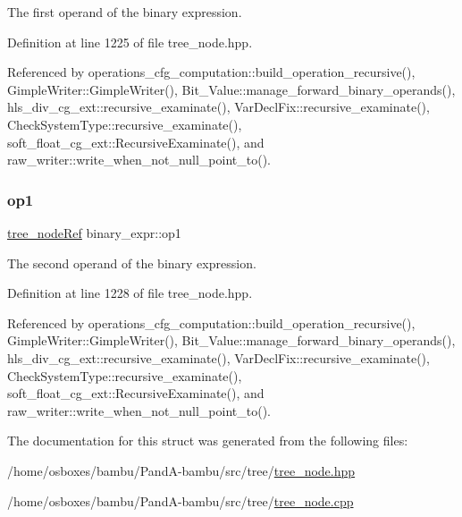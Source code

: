 The first operand of the binary expression. 



Definition at line 1225 of file tree\+\_\+node.\+hpp.



Referenced by operations\+\_\+cfg\+\_\+computation\+::build\+\_\+operation\+\_\+recursive(), Gimple\+Writer\+::\+Gimple\+Writer(), Bit\+\_\+\+Value\+::manage\+\_\+forward\+\_\+binary\+\_\+operands(), hls\+\_\+div\+\_\+cg\+\_\+ext\+::recursive\+\_\+examinate(), Var\+Decl\+Fix\+::recursive\+\_\+examinate(), Check\+System\+Type\+::recursive\+\_\+examinate(), soft\+\_\+float\+\_\+cg\+\_\+ext\+::\+Recursive\+Examinate(), and raw\+\_\+writer\+::write\+\_\+when\+\_\+not\+\_\+null\+\_\+point\+\_\+to().

\mbox{\label{structbinary__expr_ad80e58bd41c1f8e5d7c6fc632d27601e}} 
\subsubsection{\texorpdfstring{op1}{op1}}
{\footnotesize\ttfamily \hyperlink{tree__node_8hpp_a6ee377554d1c4871ad66a337eaa67fd5}{tree\+\_\+node\+Ref} binary\+\_\+expr\+::op1}



The second operand of the binary expression. 



Definition at line 1228 of file tree\+\_\+node.\+hpp.



Referenced by operations\+\_\+cfg\+\_\+computation\+::build\+\_\+operation\+\_\+recursive(), Gimple\+Writer\+::\+Gimple\+Writer(), Bit\+\_\+\+Value\+::manage\+\_\+forward\+\_\+binary\+\_\+operands(), hls\+\_\+div\+\_\+cg\+\_\+ext\+::recursive\+\_\+examinate(), Var\+Decl\+Fix\+::recursive\+\_\+examinate(), Check\+System\+Type\+::recursive\+\_\+examinate(), soft\+\_\+float\+\_\+cg\+\_\+ext\+::\+Recursive\+Examinate(), and raw\+\_\+writer\+::write\+\_\+when\+\_\+not\+\_\+null\+\_\+point\+\_\+to().



The documentation for this struct was generated from the following files\+:\begin{DoxyCompactItemize}
\item 
/home/osboxes/bambu/\+Pand\+A-\/bambu/src/tree/\hyperlink{tree__node_8hpp}{tree\+\_\+node.\+hpp}\item 
/home/osboxes/bambu/\+Pand\+A-\/bambu/src/tree/\hyperlink{tree__node_8cpp}{tree\+\_\+node.\+cpp}\end{DoxyCompactItemize}
